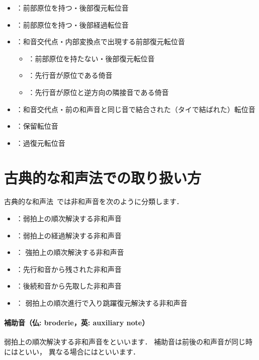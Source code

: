 \documentclass[dvipdfmx,uplatex,b5paper,openany,jbase=12Q,nomag*,textwidth-limit=44%
               ]{gachimuchi}
\begin{document}
\begin{itemize}
  \item {}：前部原位を持つ・後部復元転位音
  \item {}：前部原位を持つ・後部経過転位音
  \item {}：和音交代点・内部変換点で出現する前部復元転位音
  \begin{itemize}
    \item {}：前部原位を持たない・後部復元転位音
    \item {}：先行音が原位である倚音
    \item {}：先行音が原位と逆方向の隣接音である倚音
  \end{itemize}
  \item {}：和音交代点・前の和声音と同じ音で結合された（タイで結ばれた）転位音
  \item {}：保留転位音
  \item {}：過復元転位音
\end{itemize}

\section{古典的な和声法での取り扱い方}
古典的な和声法~\cite{chSHIMOFUSA1,chSHIMOFUSA2,mgKIKUCHI1}では非和声音を次のように分類します．
\begin{itemize}
  \item {}：弱拍上の順次解決する非和声音
  \item {}：弱拍上の経過解決する非和声音
  \item {}：  強拍上の順次解決する非和声音
  \item {}：先行和音から残された非和声音
  \item {}：後続和音から先取した非和声音
  \item {}：  弱拍上の順次進行で入り跳躍復元解決する非和声音
\end{itemize}
\paragraph{補助音（仏: broderie，英: auxiliary note）}
弱拍上の順次解決する非和声音をといいます．
補助音は前後の和声音が同じ時にはといい，
異なる場合にはといいます．
\end{document}
